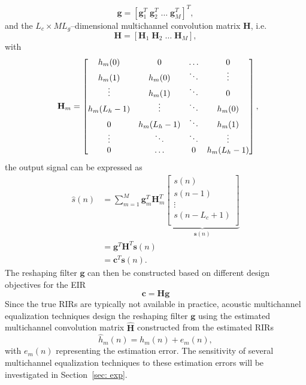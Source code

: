 \documentclass[10pt]{IEEEtran}
\begin{document}
\begin{equation}
  \mathbf{g}  =  \left[\mathbf{g}_1^T \; \mathbf{g}_2^T \; \ldots \; \mathbf{g}_M^T \right]^T,
\end{equation}
 and the $L_c \times ML_g$--dimensional multichannel convolution matrix $\mathbf{H}$, i.e.
\begin{equation}
\mathbf{H}  = \left[\mathbf{H}_1 \; \mathbf{H}_2 \; \ldots \; \mathbf{H}_M \right],
\end{equation}
with
\begin{equation}
\hspace{-0.2cm}
\mathbf{H}_m =  \begin{bmatrix}
    h_m(0) & 0 &  \ldots & 0 \\
    h_m(1) & h_m(0) & \ddots & \vdots \\
    \vdots & h_m(1) & \ddots & 0 \\
    h_m(L_h-1) & \vdots & \ddots & h_m(0) \\
    0 & h_m(L_h-1) & \ddots & h_m(1) \\
    \vdots & \ddots & \ddots & \vdots \\
    0 & \ldots & 0 & h_m(L_h-1)
   \end{bmatrix},\hspace{-0.4cm}
 \end{equation}
the output signal can be expressed as
\begin{align}
\hat{s}(n) &=  \sum_{m=1}^{M} \mathbf{g}_m^T
 \mathbf{H}_m^T
\underbrace{\left[
\begin{array}{c}
s(n) \\
s(n-1) \\
\vdots \\
s(n-L_c+1) \\
\end{array}
\right]}_{\mathbf{s}(n)}  \\
& =  \mathbf{g}^T \mathbf{H}^T \mathbf{s}(n) \\
& =  \mathbf{c}^T \mathbf{s}(n).
\end{align}
The reshaping filter $\mathbf{g}$ can then be constructed based on different design objectives for the EIR
\begin{equation}
\boxed{\mathbf{c} = \mathbf{H}\mathbf{g}}
\end{equation}
Since the true RIRs are typically not available in practice, acoustic multichannel equalization techniques design the reshaping filter $\mathbf{g}$ using the estimated multichannel convolution matrix $\hat{\mathbf{H}}$ constructed from the estimated RIRs
\begin{equation}
\label{eq: hath}
\hat{h}_m(n) = h_m(n) + e_m(n),
\end{equation}
with $e_m(n)$ representing the estimation error.
The sensitivity of several multichannel equalization techniques to these estimation errors will be investigated in Section~\ref{sec: exp}.
\end{document}

